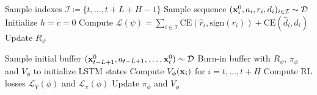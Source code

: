 \begin{algorithm}[H]
\Proc{\FUpdateRewardEndModel{}}
{
    Sample indexes $\mathcal{I} \coloneqq \{t, \dots, t+L+H-1 \}$  \;
    Sample sequence $ ( \mathbf{x}_i^0, a_i, r_i, d_i )_{i \in \mathcal{I}} \sim \mathcal{D} $ \;
    Initialize $h = c = 0$ \;  
    Compute $\mathcal{L}(\psi) = \sum_{i \in \mathcal{I}} \mathrm{CE}(\hat{r}_i, \mathrm{sign}(r_i)) + \mathrm{CE}(\hat{d}_i, d_i)$  \;
    Update $R_\psi$ \;
}

\Proc{\FUpdateActorCritic{}}
{
    Sample initial buffer $( \mathbf{x}_{t-L+1}^0, a_{t-L+1}, \dots, \mathbf{x}_t^0) \sim \mathcal{D} $ \;
    Burn-in buffer with $R_\psi$, $\pi_\phi$ and $V_\phi$ to initialize LSTM states \;
    Compute $ V_\phi(\mathbf{x}_i) $ for $i = t, \dots, t + H$ \;
    Compute RL losses $\mathcal{L}_V(\phi)$ and $\mathcal{L}_\pi(\phi)$ \;
    Update $\pi_\phi$ and $V_\phi$ \;
}
\end{algorithm}